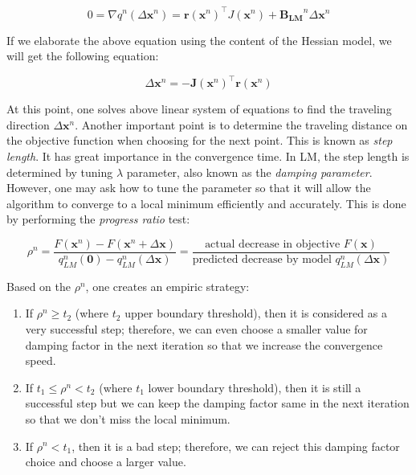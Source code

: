 \documentclass[12pt]{report}
\numberwithin{figure}{section}
\begin{document}
\begin{appendices}
\begin{equation}\label{eq:lm_descent_direction}
  0 = 
  \nabla q^{n}(\Delta \mathbf{x}^n) = 
  \mathbf{r}(\mathbf{x}^n)^\top J(\mathbf{x}^n) + 
  \mathbf{B_{LM}}^n\Delta \mathbf{x}^n
\end{equation}


If we elaborate the above equation using the content of the Hessian model, 
we will get the following equation: 

\begin{equation}
  [\mathbf{J}(\mathbf{x}^n)^\top\mathbf{J}(\mathbf{x}^n) + 
  \lambda^n\mathbf{I}]\Delta \mathbf{x}^n = 
  -\mathbf{J}(\mathbf{x}^n)^\top\mathbf{r}(\mathbf{x}^n)
\end{equation}\label{eq:damping_full}

At this point, one solves above linear system of equations to find the traveling direction 
$\Delta \mathbf{x}^n$. Another important point is to determine the traveling 
distance on the objective function when choosing for the next point. This 
is known as \textit{step length}. It has great importance in the 
convergence time. 
In LM, the step length is determined by tuning $\lambda$ parameter, also 
known as the 
\textit{damping parameter}. However, one may ask 
how to tune the parameter 
so that it will allow the algorithm to converge to a local minimum efficiently 
and accurately. This is done by performing the \textit{progress ratio} test:

\begin{equation}\label{eq:lm_progress_ratio}
  \rho^n = \frac{F(\mathbf{x}^n) - F(\mathbf{x}^n+\Delta \mathbf{x})}{q_{LM}^n(\mathbf{0})-q_{LM}^n(\Delta \mathbf{x})} =
  \frac{\text{actual decrease in objective } F(\mathbf{x})}
  {\text{predicted decrease by model } q_{LM}^n(\Delta \mathbf{\mathbf{x}})}
\end{equation}

Based on the $\rho^n$, one creates an empiric strategy:

\begin{enumerate}
  \item If $\rho^n \geq t_2$ (where $t_2$ upper boundary threshold), then it is considered as a very successful step; 
    therefore, we can even choose a smaller value for damping factor in the 
    next iteration 
    so that 
    we increase the convergence speed.
  \item If $t_1 \leq \rho^n < t_2$ (where $t_1$ lower boundary threshold), 
  then it is still a successful step but we 
    can keep the damping factor same in the next iteration so that we don't 
    miss the local minimum.
  \item If $\rho^n < t_1$, then it is a bad step; therefore, we can reject this 
    damping factor choice and choose a larger value.
\end{enumerate}


\end{appendices}
\end{document}
